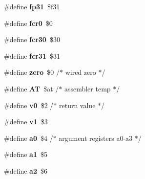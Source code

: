 \begin{DoxyCompactItemize}
\#define {\bfseries fp31}~\$f31
\item 
\mbox{\label{group__RTEMSScoreMIPSSet__iregdef_ga97b5e40ed56ff15082327bcb0e183f02}} 
\#define {\bfseries fcr0}~\$0
\item 
\mbox{\label{group__RTEMSScoreMIPSSet__iregdef_ga4bc5bcbb6a803aa2bb8f8cd14aaeb898}} 
\#define {\bfseries fcr30}~\$30
\item 
\mbox{\label{group__RTEMSScoreMIPSSet__iregdef_ga5e50ecc704ab38b834e2ceaf786c256a}} 
\#define {\bfseries fcr31}~\$31
\item 
\mbox{\label{group__RTEMSScoreMIPSSet__iregdef_ga361b1d0588e13a7b5994f24b40138ec0}} 
\#define {\bfseries zero}~\$0	/$\ast$ wired zero $\ast$/
\item 
\mbox{\label{group__RTEMSScoreMIPSSet__iregdef_gad37a804df2a1060b453ce07fe0ee3cbc}} 
\#define {\bfseries AT}~\$at	/$\ast$ assembler temp $\ast$/
\item 
\mbox{\label{group__RTEMSScoreMIPSSet__iregdef_ga2b3f75463b42545c79b95790e5bc0329}} 
\#define {\bfseries v0}~\$2	/$\ast$ return value $\ast$/
\item 
\mbox{\label{group__RTEMSScoreMIPSSet__iregdef_gae6c3ee9933cc50ea02782419401e84f0}} 
\#define {\bfseries v1}~\$3
\item 
\mbox{\label{group__RTEMSScoreMIPSSet__iregdef_gaa42b800f0f58b50bc7604c67cc2853ab}} 
\#define {\bfseries a0}~\$4	/$\ast$ argument registers a0-\/a3 $\ast$/
\item 
\mbox{\label{group__RTEMSScoreMIPSSet__iregdef_gab89a77e63a7226fffaecb2e2c2ab5219}} 
\#define {\bfseries a1}~\$5
\item 
\mbox{\label{group__RTEMSScoreMIPSSet__iregdef_gaa3fd046b2956875cf908d73a51a96b42}} 
\#define {\bfseries a2}~\$6
\item 

\end{DoxyCompactItemize}

